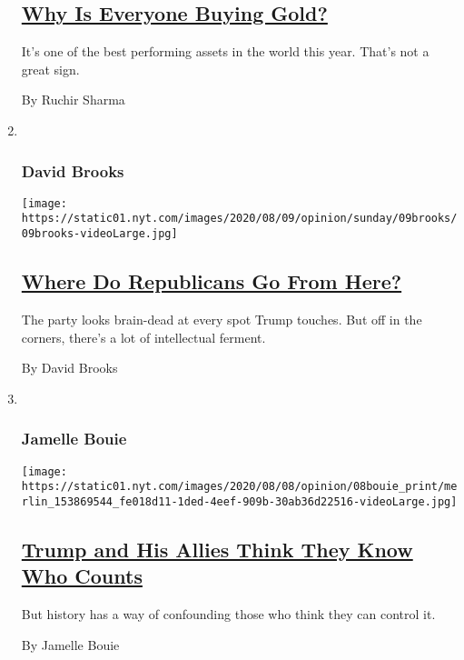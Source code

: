 \begin{enumerate}
  \hypertarget{why-is-everyone-buying-gold}{%
  \subsection{\texorpdfstring{\href{/2020/08/08/opinion/gold-investment-coronavirus.html}{Why
  Is Everyone Buying
  Gold?}}{Why Is Everyone Buying Gold?}}\label{why-is-everyone-buying-gold}}

  It's one of the best performing assets in the world this year. That's
  not a great sign.

  By Ruchir Sharma
\item ~
  \hypertarget{david-brooks}{%
  \subsubsection{David Brooks}\label{david-brooks}}

  \texttt{[image: https://static01.nyt.com/images/2020/08/09/opinion/sunday/09brooks/09brooks-videoLarge.jpg]}

  \hypertarget{where-do-republicans-go-from-here}{%
  \subsection{\texorpdfstring{\href{/2020/08/07/opinion/sunday/republican-party-trump-2020.html}{Where
  Do Republicans Go From
  Here?}}{Where Do Republicans Go From Here?}}\label{where-do-republicans-go-from-here}}

  The party looks brain-dead at every spot Trump touches. But off in the
  corners, there's a lot of intellectual ferment.

  By David Brooks
\item ~
  \hypertarget{jamelle-bouie}{%
  \subsubsection{Jamelle Bouie}\label{jamelle-bouie}}

  \texttt{[image: https://static01.nyt.com/images/2020/08/08/opinion/08bouie\_print/merlin\_153869544\_fe018d11-1ded-4eef-909b-30ab36d22516-videoLarge.jpg]}

  \hypertarget{trump-and-his-allies-think-they-know-who-counts}{%
  \subsection{\texorpdfstring{\href{/2020/08/07/opinion/trump-2020-census.html}{Trump
  and His Allies Think They Know Who
  Counts}}{Trump and His Allies Think They Know Who Counts}}\label{trump-and-his-allies-think-they-know-who-counts}}

  But history has a way of confounding those who think they can control
  it.

  By Jamelle Bouie
\end{enumerate}

